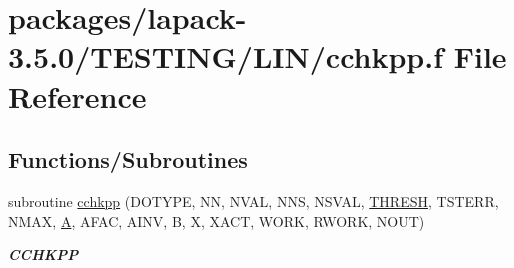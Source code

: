 \hypertarget{cchkpp_8f}{}\section{packages/lapack-\/3.5.0/\+T\+E\+S\+T\+I\+N\+G/\+L\+I\+N/cchkpp.f File Reference}
\label{cchkpp_8f}
\subsection*{Functions/\+Subroutines}
\begin{DoxyCompactItemize}
\item 
subroutine \hyperlink{group__complex__lin_ga2d7cfe64f95e756c927b296a15e52190}{cchkpp} (D\+O\+T\+Y\+P\+E, N\+N, N\+V\+A\+L, N\+N\+S, N\+S\+V\+A\+L, \hyperlink{zlaqgs_8c_a0656018abfc9fa2821827415f5d5ea57}{T\+H\+R\+E\+S\+H}, T\+S\+T\+E\+R\+R, N\+M\+A\+X, \hyperlink{classA}{A}, A\+F\+A\+C, A\+I\+N\+V, B, X, X\+A\+C\+T, W\+O\+R\+K, R\+W\+O\+R\+K, N\+O\+U\+T)
\begin{DoxyCompactList}\small\item\em {\bfseries C\+C\+H\+K\+P\+P} \end{DoxyCompactList}\end{DoxyCompactItemize}
